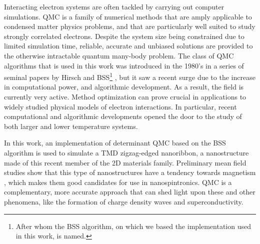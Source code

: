 Interacting electron systems are often tackled by carrying out computer simulations.
\ac{QMC} is a family of numerical methods that are  amply applicable to condensed matter physics problems, and that are particularly well suited to study strongly correlated electrons.
Despite the system size being constrained due to limited simulation time, reliable, accurate and unbiased solutions are provided to the otherwise intractable quantum many-body problem.
The class of \acs{QMC} algorithms that is used in this work was introduced in the 1980's in a series of seminal papers by Hirsch and \acl{BSS}\footnote{After whom the \ac{BSS} algorithm, on which we based the implementation used in this work, is named.} \cite{hirsch_discrete_1983, hirsch_monte_1982, blankenbecler_monte_1981, hirsch_two-dimensional_1985, hirsch_monte_1983, hirsch_stable_1988, hirsch_antiferromagnetism_1989}, but it saw a recent surge \cite{dumitrescu_superconductivity_2016, berg_monte_2018, beyl_revisiting_2018, chang_recent_2015, esterlis_breakdown_2018, mondaini_determinant_2012, meng_characterization_2014, kung_characterizing_2016, johnston_determinant_2013, rademaker_determinant_2013, ying_determinant_2014, scalettar_numerical_2007, zhou_quantum_2014} due to the increase in computational power, and algorithmic development.
As a result, the field is currently very active. 
Method optimization can prove crucial in applications to widely studied physical models of electron interactions.
In particular, recent computational and algorithmic developments opened the door to the study of both larger and lower temperature systems.

In this work, an implementation of determinant \acs{QMC} based on the \ac{BSS} algorithm is used to simulate a \ac{TMD} zigzag-edged nanoribbon, a nanostructure made of this recent member of the \acs{2D} materials family.
Preliminary mean field studies show that this type of nanostructures have a tendency towards magnetism \cite{yazyev_emergence_2010}, which makes them good candidates for use in nanospintronics.
\acs{QMC} is a complementary, more accurate approach that can shed light upon these and other phenomena, like the formation of charge density waves and superconductivity.
